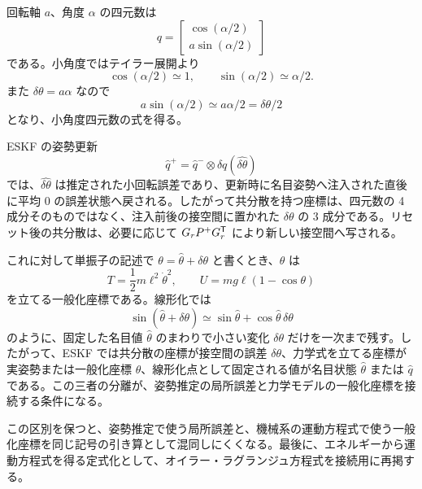 \begin{derivation}
回転軸 $a$、角度 $\alpha$ の四元数は
\begin{equation}
  q=\begin{bmatrix}\cos(\alpha/2)\\ a\sin(\alpha/2)\end{bmatrix}
\end{equation}
である。小角度ではテイラー展開より
\begin{equation}
  \cos(\alpha/2)\simeq1,
  \qquad
  \sin(\alpha/2)\simeq\alpha/2.
\end{equation}
また $\delta\theta=a\alpha$ なので
\begin{equation}
  a\sin(\alpha/2)\simeq a\alpha/2=\delta\theta/2
\end{equation}
となり、小角度四元数の式を得る。
\end{derivation}

ESKF の姿勢更新
\begin{equation}
  \hat{q}^{+}=\hat{q}^{-}\otimes\delta q(\widehat{\delta\theta})
\end{equation}
では、$\widehat{\delta\theta}$ は推定された小回転誤差であり、更新時に名目姿勢へ注入された直後に平均 0 の誤差状態へ戻される。したがって共分散を持つ座標は、四元数の 4 成分そのものではなく、注入前後の接空間に置かれた $\delta\theta$ の 3 成分である。リセット後の共分散は、必要に応じて $G_rP^+G_r^{\mathsf{T}}$ により新しい接空間へ写される。

これに対して単振子の記述で $\theta=\hat{\theta}+\delta\theta$ と書くとき、$\theta$ は
\begin{equation}
  T=\frac{1}{2}m\ell^2\dot{\theta}^2,\qquad
  U=mg\ell(1-\cos\theta)
\end{equation}
を立てる一般化座標である。線形化では
\begin{equation}
  \sin(\hat{\theta}+\delta\theta)
  \simeq
  \sin\hat{\theta}+\cos\hat{\theta}\,\delta\theta
\end{equation}
のように、固定した名目値 $\hat{\theta}$ のまわりで小さい変化 $\delta\theta$ だけを一次まで残す。したがって、ESKF では共分散の座標が接空間の誤差 $\delta\theta$、力学式を立てる座標が実姿勢または一般化座標 $\theta$、線形化点として固定される値が名目状態 $\hat{\theta}$ または $\hat{q}$ である。この三者の分離が、姿勢推定の局所誤差と力学モデルの一般化座標を接続する条件になる。

この区別を保つと、姿勢推定で使う局所誤差と、機械系の運動方程式で使う一般化座標を同じ記号の引き算として混同しにくくなる。最後に、エネルギーから運動方程式を得る定式化として、オイラー・ラグランジュ方程式を接続用に再掲する。

